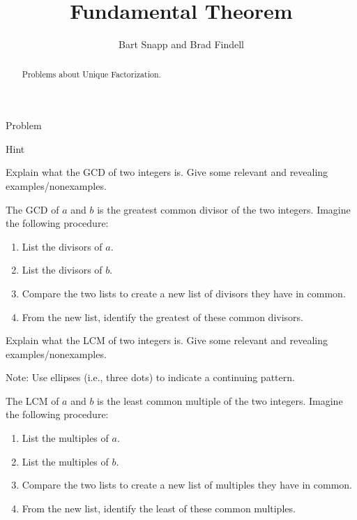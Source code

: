 \documentclass[nooutcomes]{ximera}
\title{Fundamental Theorem}
\author{Bart Snapp and Brad Findell}
\begin{document}
\begin{abstract}
Problems about Unique Factorization.
\end{abstract}
\maketitle


\begin{problem}
Problem
\begin{freeResponse}
\begin{hint}
Hint
\end{hint}
\end{freeResponse}
\end{problem} 


\begin{problem}
Explain what the GCD of two integers is. Give some relevant and
  revealing examples/nonexamples.
\begin{freeResponse}
\begin{hint}
The GCD of $a$ and $b$ is the greatest common divisor of the two integers.  Imagine the following procedure: 
\begin{enumerate}
\item List the divisors of $a$.  
\item List the divisors of $b$.  
\item Compare the two lists to create a new list of divisors they have in common.  
\item From the new list, identify the greatest of these common divisors.  
\end{enumerate}
\end{hint}
\end{freeResponse}
\end{problem}

\begin{problem}
Explain what the LCM of two integers is. Give some relevant and
  revealing examples/nonexamples.
\begin{freeResponse}
\begin{hint}
Note: Use ellipses (i.e., three dots) to indicate a continuing pattern.

The LCM of $a$ and $b$ is the least common multiple of the two integers.  Imagine the following procedure: 
\begin{enumerate}
\item List the multiples of $a$.   
\item List the multiples of $b$.  
\item Compare the two lists to create a new list of multiples they have in common.  
\item From the new list, identify the least of these common multiples.  
\end{enumerate}
\end{hint}
\end{freeResponse}
\end{problem}
\end{document}
